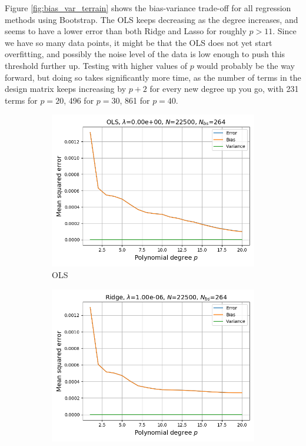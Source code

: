 \documentclass[a4paper]{article}
\begin{document}
Figure \ref{fig:bias_var_terrain} shows the bias-variance trade-off for all regression methods using Bootstrap. The OLS keeps decreasing as the degree increases, and seems to have a lower error than both Ridge and Lasso for roughly $p>11$. Since we have so many data points, it might be that the OLS does not yet start overfitting, and possibly the noise level of the data is low enough to push this threshold further up. Testing with higher values of $p$ would probably be the way forward, but doing so takes significantly more time, as the number of terms in the design matrix keeps increasing by $p+2$ for every new degree up you go, with 231 terms for $p=20$, 496 for $p=30$, 861 for $p=40$.
\begin{figure}[H]
  \centering
  \begin{subfigure}{0.49\textwidth}
    \includegraphics[scale=0.45]{../figures/task_g/OLS/bias_variance_N22500_patch1_pmax20_nlamb1_OLS_boot_Nbs264_opt1.png}
    \caption{OLS}
  \end{subfigure}
  \begin{subfigure}{0.49\textwidth}
    \includegraphics[scale=0.45]{../figures/task_g/Ridge/bias_variance_N22500_patch1_pmax20_nlamb15_Ridge_boot_Nbs264_opt1.png}

\end{subfigure}
\end{figure}
\end{document}
